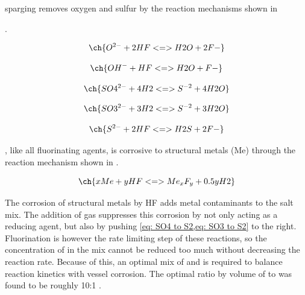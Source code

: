  sparging removes oxygen and sulfur by the reaction
mechanisms shown in

 \cite{rev30}. \par

\begin{equation}
  \ch{O^{2-} + 2 HF <=> H2O + 2 F-} \label{eq: O2 to H2O} \\
\end{equation}

\begin{equation}
  \ch{OH^{-} + HF <=> H2O + F-} \label{eq: OH to H2O} \\
\end{equation}

\begin{equation}
  \ch{SO4^{2-} + 4 H2 <=> S^{-2} + 4 H2O} \label{eq: SO4 to S2} \\
\end{equation}

\begin{equation}
  \ch{SO3^{2-} + 3 H2 <=> S^{-2} + 3 H2O} \label{eq: SO3 to S2} \\
\end{equation}

\begin{equation}
  \ch{S^{2-} + 2 HF <=> H2S + 2F-} \label{eq: S to H2S} \\
\end{equation}

, like all fluorinating agents, is corrosive to structural metals
(Me) through the reaction mechanism shown in  \cite{rev30}. \par

\begin{equation}
  \ch{xMe + yHF <=> Me_xF_y + 0.5 yH2} \label{eq: metal oxidation}
\end{equation}

The corrosion of structural metals by HF adds metal contaminants to
the salt mix. The addition of  gas
suppresses this corrosion by not only acting as a reducing agent, but
also by pushing \cref{eq: SO4 to S2,eq: SO3 to S2} to the
right. Fluorination is however the rate limiting step of these
reactions, so the concentration of  in the
mix cannot be reduced too much without decreasing the reaction rate.
Because of this, an optimal mix
of  and  is required to balance reaction kinetics with vessel
corrosion. The optimal ratio by volume
of  to  was found to be roughly 10:1 \cite{rev21,rev30}. \par

